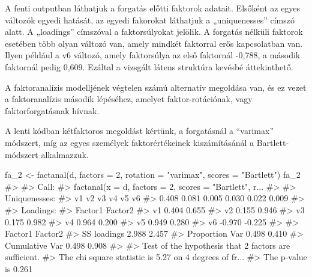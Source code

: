 \documentclass[
  letterpaper,
]{krantz}
\makeatletter
\newenvironment{Shaded}{\begin{snugshade}}{\end{snugshade}}
\newcommand{\AttributeTok}[1]{\textcolor[rgb]{0.40,0.45,0.13}{#1}}
\newcommand{\CommentTok}[1]{\textcolor[rgb]{0.37,0.37,0.37}{#1}}
\newcommand{\DecValTok}[1]{\textcolor[rgb]{0.68,0.00,0.00}{#1}}
\newcommand{\FunctionTok}[1]{\textcolor[rgb]{0.28,0.35,0.67}{#1}}
\newcommand{\NormalTok}[1]{\textcolor[rgb]{0.00,0.23,0.31}{#1}}
\newcommand{\OtherTok}[1]{\textcolor[rgb]{0.00,0.23,0.31}{#1}}
\newcommand{\StringTok}[1]{\textcolor[rgb]{0.13,0.47,0.30}{#1}}
\newenvironment{kframe}{%
\medskip{}
\setlength{\fboxsep}{.8em}
 \def\at@end@of@kframe{}%
 \ifinner\ifhmode%
  \def\at@end@of@kframe{\end{minipage}}%
  \begin{minipage}{\columnwidth}%
 \fi\fi%
 \def\FrameCommand##1{\hskip\@totalleftmargin \hskip-\fboxsep
 \colorbox{shadecolor}{##1}\hskip-\fboxsep
     \hskip-\linewidth \hskip-\@totalleftmargin \hskip\columnwidth}%
 \MakeFramed {\advance\hsize-\width
   \@totalleftmargin\z@ \linewidth\hsize
   \@setminipage}}%
 {\par\unskip\endMakeFramed%
 \at@end@of@kframe}
\renewenvironment{Shaded}{\begin{kframe}}{\end{kframe}}
\makeatother
\begin{document}
A fenti outputban láthatjuk a forgatás előtti faktorok adatait. Elsőként
az egyes változók egyedi hatását, az egyedi fakorokat láthatjuk a
„uniquenesses'' címszó alatt. A „loadings'' címszóval a faktorsúlyokat
jelölik. A forgatás nélküli faktorok esetében több olyan változó van,
amely mindkét faktorral erős kapcsolatban van. Ilyen például a v6
változó, amely faktorsúlya az első faktornál -0,788, a második faktornál
pedig 0,609. Ezáltal a vizsgált látens struktúra kevésbé áttekinthető.

A faktoranalízis modelljének végtelen számú alternatív megoldása van, és
ez vezet a faktoranalízis második lépéséhez, amelyet faktor-rotációnak,
vagy faktorforgatásnak hívnak.

A lenti kódban kétfaktoros megoldást kértünk, a forgatásnál a
``varimax'' módszert, míg az egyes személyek faktorértékeinek
kiszámításánál a Bartlett-módszert alkalmazzuk.

\begin{Shaded}
\begin{Highlighting}[]
\NormalTok{fa\_2 }\OtherTok{\textless{}{-}} \FunctionTok{factanal}\NormalTok{(d, }\AttributeTok{factors =} \DecValTok{2}\NormalTok{, }\AttributeTok{rotation =} \StringTok{"varimax"}\NormalTok{, }\AttributeTok{scores =} \StringTok{"Bartlett"}\NormalTok{)}
\NormalTok{fa\_2}
\CommentTok{\#\textgreater{} }
\CommentTok{\#\textgreater{} Call:}
\CommentTok{\#\textgreater{} factanal(x = d, factors = 2, scores = "Bartlett", r...}
\CommentTok{\#\textgreater{} }
\CommentTok{\#\textgreater{} Uniquenesses:}
\CommentTok{\#\textgreater{}    v1    v2    v3    v4    v5    v6 }
\CommentTok{\#\textgreater{} 0.408 0.081 0.005 0.030 0.022 0.009 }
\CommentTok{\#\textgreater{} }
\CommentTok{\#\textgreater{} Loadings:}
\CommentTok{\#\textgreater{}    Factor1 Factor2}
\CommentTok{\#\textgreater{} v1  0.404   0.655 }
\CommentTok{\#\textgreater{} v2  0.155   0.946 }
\CommentTok{\#\textgreater{} v3  0.175   0.982 }
\CommentTok{\#\textgreater{} v4  0.964   0.200 }
\CommentTok{\#\textgreater{} v5  0.949   0.280 }
\CommentTok{\#\textgreater{} v6 {-}0.970  {-}0.225 }
\CommentTok{\#\textgreater{} }
\CommentTok{\#\textgreater{}                Factor1 Factor2}
\CommentTok{\#\textgreater{} SS loadings      2.988   2.457}
\CommentTok{\#\textgreater{} Proportion Var   0.498   0.410}
\CommentTok{\#\textgreater{} Cumulative Var   0.498   0.908}
\CommentTok{\#\textgreater{} }
\CommentTok{\#\textgreater{} Test of the hypothesis that 2 factors are sufficient.}
\CommentTok{\#\textgreater{} The chi square statistic is 5.27 on 4 degrees of fr...}
\CommentTok{\#\textgreater{} The p{-}value is 0.261}
\end{Highlighting}
\end{Shaded}
\end{document}
